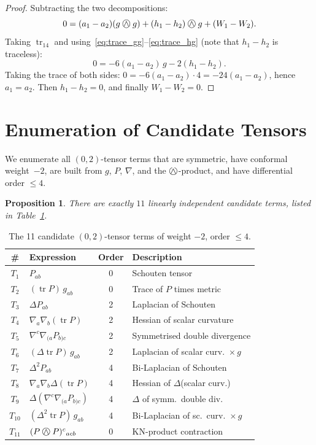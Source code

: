 \documentclass[11pt,a4paper]{article}
\newcommand{\owedge}{\mathbin{%
  \text{%
    \ooalign{%
      \hfil$\wedge$\hfil\cr
      \hfil\raisebox{0.05em}{$\bigcirc$}\hfil\cr
    }%
  }%
}}
\newtheorem{proposition}[theorem]{Proposition}
\begin{document}
\begin{proof}
Subtracting the two decompositions:
\[
  0 = (a_1-a_2)(g\owedge g) + (h_1-h_2)\owedge g + (W_1-W_2).
\]
Taking $\operatorname{tr}_{14}$ and using~\eqref{eq:trace_gg}--\eqref{eq:trace_hg}
(note that $h_1 - h_2$ is traceless):
\[
  0 = -6(a_1-a_2)\,g - 2(h_1-h_2).
\]
Taking the trace of both sides: $0 = -6(a_1-a_2)\cdot 4 = -24(a_1-a_2)$,
hence $a_1 = a_2$. Then $h_1 - h_2 = 0$, and finally
$W_1 - W_2 = 0$.
\end{proof}

\section{Enumeration of Candidate Tensors}
\label{sec:enumeration}

We enumerate all $(0,2)$-tensor terms that are symmetric, have conformal
weight~$-2$, are built from $g$, $P$, $\nabla$, and the $\owedge$-product,
and have differential order $\le 4$.

\begin{proposition}
\label{prop:11terms}
There are exactly $11$ linearly independent candidate terms, listed in
Table~\ref{tab:terms}.
\end{proposition}

\begin{table}[ht]
\centering
\caption{The 11 candidate $(0,2)$-tensor terms of weight $-2$, order $\le 4$.}
\label{tab:terms}
\begin{tabular}{clcl}
\toprule
\# & Expression & Order & Description \\
\midrule
$T_1$ & $P_{ab}$ & 0 & Schouten tensor \\
$T_2$ & $(\operatorname{tr} P)\,g_{ab}$ & 0 & Trace of $P$ times metric \\
$T_3$ & $\Delta P_{ab}$ & 2 & Laplacian of Schouten \\
$T_4$ & $\nabla_a\nabla_b(\operatorname{tr} P)$ & 2 & Hessian of scalar curvature \\
$T_5$ & $\nabla^c\nabla_{(a}P_{b)c}$ & 2 & Symmetrised double divergence \\
$T_6$ & $(\Delta\operatorname{tr} P)\,g_{ab}$ & 2 & Laplacian of scalar curv.\ $\times\, g$ \\
$T_7$ & $\Delta^2 P_{ab}$ & 4 & Bi-Laplacian of Schouten \\
$T_8$ & $\nabla_a\nabla_b\Delta(\operatorname{tr} P)$ & 4 & Hessian of $\Delta$(scalar curv.) \\
$T_9$ & $\Delta(\nabla^c\nabla_{(a}P_{b)c})$ & 4 & $\Delta$ of symm.\ double div. \\
$T_{10}$ & $(\Delta^2\operatorname{tr} P)\,g_{ab}$ & 4 & Bi-Laplacian of sc.\ curv.\ $\times\, g$ \\
$T_{11}$ & $(P \owedge P)^c{}_{acb}$ & 0 & KN-product contraction \\
\bottomrule
\end{tabular}
\end{table}
\end{document}

